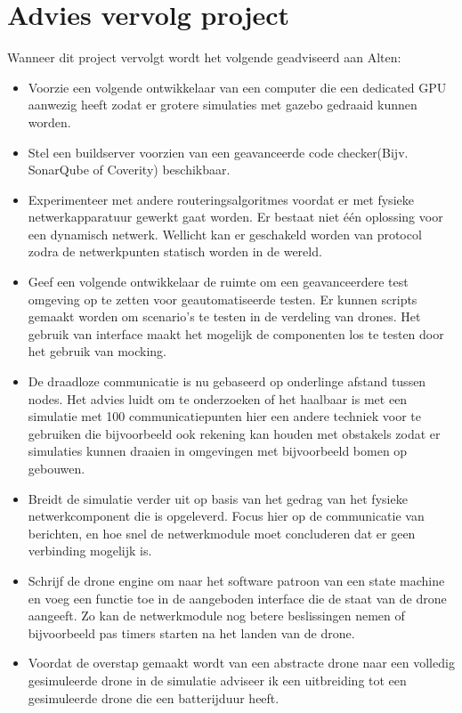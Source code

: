 \documentclass[a4paper, 11pt, oneside]{report}
\begin{document}
\section{Advies vervolg project}\label{sec:advies-vervolg-project}
Wanneer dit project vervolgt wordt het volgende geadviseerd aan Alten:
\begin{itemize}
	\item Voorzie een volgende ontwikkelaar van een computer die een dedicated GPU aanwezig heeft zodat er grotere simulaties met gazebo gedraaid kunnen worden.
	
	\item Stel een buildserver voorzien van een geavanceerde code checker(Bijv. SonarQube of Coverity) beschikbaar.
	 
	\item Experimenteer met andere routeringsalgoritmes voordat er met fysieke netwerkapparatuur gewerkt gaat worden. Er bestaat niet één oplossing voor een dynamisch netwerk. Wellicht kan er geschakeld worden van protocol zodra de netwerkpunten statisch worden in de wereld.  
	
	\item Geef een volgende ontwikkelaar de ruimte om een geavanceerdere test omgeving op te zetten voor geautomatiseerde testen.
	Er kunnen scripts gemaakt worden om scenario's te testen in de verdeling van drones. Het gebruik van interface maakt het mogelijk de componenten los te testen door het gebruik van mocking.
	
	\item De draadloze communicatie is nu gebaseerd op onderlinge afstand tussen nodes. Het advies luidt om te onderzoeken of het haalbaar is met een simulatie met 100 communicatiepunten hier een andere techniek voor te gebruiken die bijvoorbeeld ook rekening kan houden met obstakels zodat er simulaties kunnen draaien in omgevingen met bijvoorbeeld bomen op gebouwen.
	
	\item Breidt de simulatie verder uit op basis van het gedrag van het fysieke netwerkcomponent die is opgeleverd. Focus hier op de communicatie van berichten, en hoe snel de netwerkmodule moet concluderen dat er geen verbinding mogelijk is.
	
	\item Schrijf de drone engine om naar het software patroon van een state machine en voeg een functie toe in de aangeboden interface die de staat van de drone aangeeft. Zo kan de netwerkmodule nog betere beslissingen nemen of bijvoorbeeld pas timers starten na het landen van de drone.
	\item Voordat de overstap gemaakt wordt van een abstracte drone naar een volledig gesimuleerde drone in de simulatie adviseer ik een uitbreiding tot een gesimuleerde drone die een batterijduur heeft.
\end{itemize}
\end{document}
